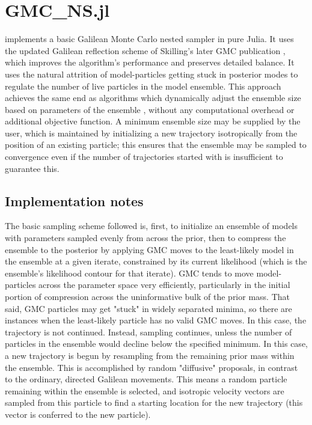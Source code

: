 \chapter{GMC\_NS.jl}
\label{ch:GMC}
 implements a basic Galilean Monte Carlo nested sampler \cite{Skilling2012,Skilling2019} in pure Julia. It uses the updated Galilean reflection scheme of Skilling's later GMC publication \cite{Skilling2019}, which improves the algorithm's performance and preserves detailed balance. It uses the natural attrition of model-particles getting stuck in posterior modes to regulate the number of live particles in the model ensemble. This approach achieves the same end as algorithms which dynamically adjust the ensemble size based on parameters of the ensemble \cite{Feroz2009,Higson2019}, without any computational overhead or additional objective function. A minimum ensemble size may be supplied by the user, which is maintained by initializing a new trajectory isotropically from the position of an existing particle; this ensures that the ensemble may be sampled to convergence even if the number of trajectories started with is insufficient to guarantee this. 

\section{Implementation notes}

The basic sampling scheme followed is, first, to initialize an ensemble of models with parameters sampled evenly from across the prior, then to compress the ensemble to the posterior by applying GMC moves to the least-likely model in the ensemble at a given iterate, constrained by its current likelihood (which is the ensemble's likelihood contour for that iterate). GMC tends to move model-particles across the parameter space very efficiently, particularly in the initial portion of compression across the uninformative bulk of the prior mass. That said, GMC particles may get "stuck" in widely separated minima, so there are instances when the least-likely particle has no valid GMC moves. In this case, the trajectory is not continued. Instead, sampling continues, unless the number of particles in the ensemble would decline below the specified minimum. In this case, a new trajectory is begun by resampling from the remaining prior mass within the ensemble. This is accomplished by random "diffusive" proposals, in contrast to the ordinary, directed Galilean movements. This means a random particle remaining within the ensemble is selected, and isotropic velocity vectors are sampled from this particle to find a starting location for the new trajectory (this vector is conferred to the new particle).

